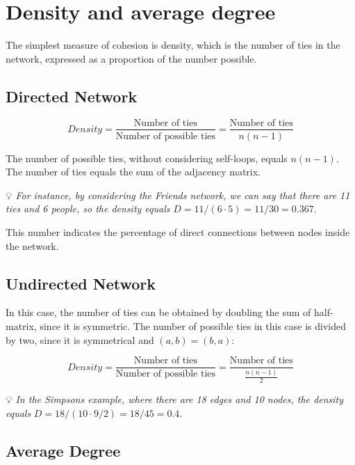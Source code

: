 \documentclass[
  notitlepage,
  onecolumn,
  openany]{book}
\begin{document}
\hypertarget{density-and-average-degree}{%
\section{Density and average degree}\label{density-and-average-degree}}

The simplest measure of cohesion is density, which is the number of ties in the network, expressed as a proportion of the number possible.

\hypertarget{directed-network-1}{%
\subsection{Directed Network}\label{directed-network-1}}

\[
Density = \frac{\text{Number of ties}}{\text{Number of possible ties}} =\frac{\text{Number of ties}}{n(n-1)} 
\]

The number of possible ties, without considering self-loops, equals \(n(n-1)\). The number of ties equals the sum of the adjacency matrix.

💡 \emph{For instance, by considering the Friends network, we can say that there are 11 ties and 6 people, so the density equals} \(D = 11/(6\cdot 5) = 11/30 = 0.367\).

This number indicates the percentage of direct connections between nodes inside the network.

\hypertarget{undirected-network-1}{%
\subsection{Undirected Network}\label{undirected-network-1}}

In this case, the number of ties can be obtained by doubling the sum of half-matrix, since it is symmetric. The number of possible ties in this case is divided by two, since it is symmetrical and \((a,b) = (b,a)\):

\[
Density = \frac{\text{Number of ties}}{\text{Number of possible ties}} =\frac{\text{Number of ties}}{\frac{n(n-1)}{2}} 
\]

💡 \emph{In the Simpsons example, where there are 18 edges and 10 nodes, the density equals} \(D = 18/(10\cdot 9/2) = 18/45 = 0.4\).

\hypertarget{average-degree}{%
\subsection{Average Degree}\label{average-degree}}
\end{document}
